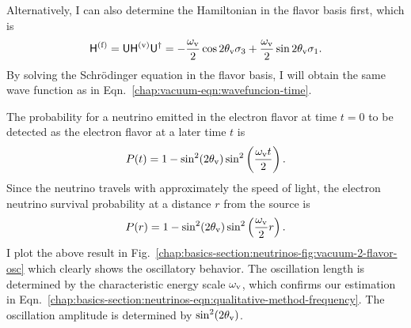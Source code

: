 Alternatively, I can also determine the Hamiltonian in the flavor basis first, which is
\begin{equation}
\mathsf H^{(\ff)} = \mathsf U \mathsf H^{(\vv)} \mathsf U^\dagger = -\frac{\omega_\vv}{2}\cos 2\theta_\vv \sigma_3 + \frac{\omega_\vv}{2} \sin 2\theta_\vv \sigma_1.
    \label{chap:basics-sec:vacuum-osc-eqn:hamiltonian-vacuum}
\end{equation}
By solving the Schr\"{o}dinger equation in the flavor basis, I will obtain the same wave function as in Eqn.~\eqref{chap:vacuum-eqn:wavefuncion-time}.

The probability for a neutrino emitted in the electron flavor at time $t=0$ to be detected as the electron flavor at a later time $t$ is
\begin{equation}
P(t) = 1-\sin^2(2\theta_\mathrm v)\sin^2\left( \frac{\omega_\mathrm v t}{2} \right).
\end{equation}
Since the neutrino travels with approximately the speed of light, the electron neutrino survival probability at a distance $r$ from the source is
\begin{equation}
P(r) =  1-\sin^2(2\theta_\vv)\sin^2\left( \frac{\omega_\vv}{2} r \right).
\label{chap:basics-eqn:vacuum-electron-probability}
\end{equation}
I plot the above result in Fig.~\ref{chap:basics-section:neutrinos-fig:vacuum-2-flavor-osc} which clearly shows the oscillatory behavior. The oscillation length is determined by the characteristic energy scale $\omega_\mathrm v$, which confirms our estimation in Eqn.~\eqref{chap:basics-section:neutrinos-eqn:qualitative-method-frequency}. The oscillation amplitude is determined by $\sin^2(2\theta_\mathrm v)$.

